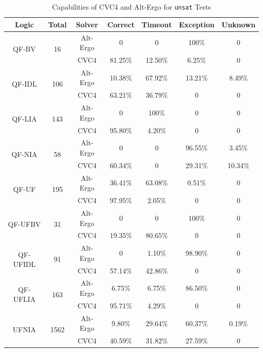 \documentclass[10pt,letter]{article}
\theoremstyle{definition}
\begin{document}
\begin{table}[!ht]
\small
\centering
\begin{tabular}{|cc|c|cccc|}
\hline
\bf Logic & \bf Total &\bf Solver &\bf Correct &\bf Timeout &\bf Exception & \bf Unknown\\\hline
\multirow{2}{*}{QF-BV} & \multirow{2}{*}{16} & Alt-Ergo & 0 & 0 & 100\% & 0\\
& & CVC4 & 81.25\% & 12.50\% & 6.25\% & 0\\\hline
\multirow{2}{*}{QF-IDL} & \multirow{2}{*}{106} & Alt-Ergo & 10.38\% & 67.92\% & 13.21\% & 8.49\%\\
& & CVC4 & 63.21\% & 36.79\% & 0 & 0\\\hline
\multirow{2}{*}{QF-LIA} & \multirow{2}{*}{143} & Alt-Ergo & 0 & 100\% & 0 & 0\\
& & CVC4 & 95.80\% & 4.20\% & 0 & 0\\\hline
\multirow{2}{*}{QF-NIA} & \multirow{2}{*}{58} & Alt-Ergo & 0 & 0 & 96.55\% & 3.45\%\\
& & CVC4 & 60.34\% & 0 & 29.31\% & 10.34\%\\\hline
\multirow{2}{*}{QF-UF} & \multirow{2}{*}{195} & Alt-Ergo & 36.41\% & 63.08\% & 0.51\% & 0\\
& & CVC4 & 97.95\% & 2.05\% & 0 & 0\\\hline
\multirow{2}{*}{QF-UFBV} & \multirow{2}{*}{31} & Alt-Ergo & 0 & 0 & 100\% & 0\\
& & CVC4 & 19.35\% & 80.65\% & 0 & 0\\\hline
\multirow{2}{*}{QF-UFIDL} & \multirow{2}{*}{91} & Alt-Ergo & 0 & 1.10\% & 98.90\% & 0\\
& & CVC4 & 57.14\% & 42.86\% & 0 & 0\\\hline
\multirow{2}{*}{QF-UFLIA} & \multirow{2}{*}{163} & Alt-Ergo & 6.75\% & 6.75\% & 86.50\% & 0\\
& & CVC4 & 95.71\% & 4.29\% & 0 & 0\\\hline
\multirow{2}{*}{UFNIA} & \multirow{2}{*}{1562} & Alt-Ergo & 9.80\% & 29.64\% & 60.37\% & 0.19\%\\
& & CVC4 & 40.59\% & 31.82\% & 27.59\% & 0\\\hline
\end{tabular}
\caption{Capabilities of CVC4 and Alt-Ergo for {\tt unsat} Tests}
\label{t:result}
\end{table}
\end{document}
